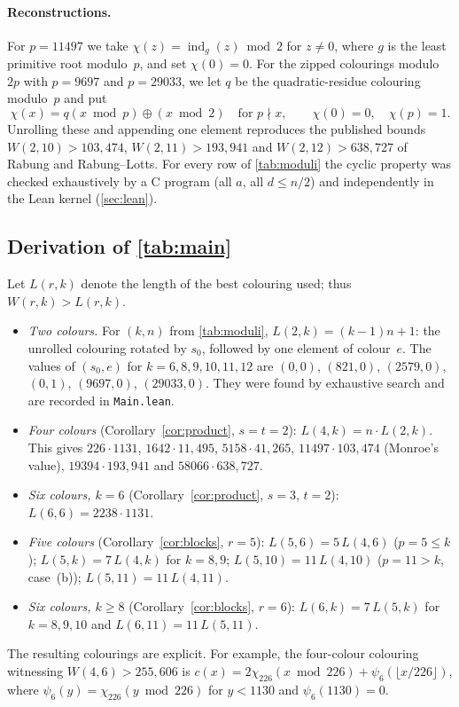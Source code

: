 \documentclass[11pt]{article}
\numberwithin{equation}{section}
\theoremstyle{definition}
\theoremstyle{remark}
\newcommand{\W}{W}
\begin{document}
\paragraph{Reconstructions.}
For $p=11497$ we take $\chi(z)=\operatorname{ind}_g(z)\bmod 2$ for $z\neq0$, where $g$ is the
least primitive root modulo~$p$, and set $\chi(0)=0$.  For the zipped colourings modulo $2p$
with $p=9697$ and $p=29033$, we let $q$ be the quadratic-residue colouring modulo~$p$ and put
\[ \chi(x)=q(x\bmod p)\oplus(x\bmod 2)\quad\text{for }p\nmid x,\qquad \chi(0)=0,\quad \chi(p)=1.\]
Unrolling these and appending one element reproduces the published bounds $\W(2,10)>103{,}474$,
$\W(2,11)>193{,}941$ and $\W(2,12)>638{,}727$ of Rabung and Rabung--Lotts.  For every row of
\cref{tab:moduli} the cyclic property was checked exhaustively by a C program (all $a$, all
$d\le n/2$) and independently in the Lean kernel (\cref{sec:lean}).

\subsection{Derivation of \texorpdfstring{\cref{tab:main}}{Table 1}}
Let $L(r,k)$ denote the length of the best colouring used; thus $\W(r,k)>L(r,k)$.
\begin{itemize}
\item \emph{Two colours.}  For $(k,n)$ from \cref{tab:moduli}, $L(2,k)=(k-1)n+1$: the unrolled
  colouring rotated by $s_0$, followed by one element of colour~$e$.  The values of $(s_0,e)$
  for $k=6,8,9,10,11,12$ are $(0,0)$, $(821,0)$, $(2579,0)$, $(0,1)$, $(9697,0)$, $(29033,0)$.
  They were found by exhaustive search and are recorded in \texttt{Main.lean}.
\item \emph{Four colours} (Corollary~\ref{cor:product}, $s=t=2$): $L(4,k)=n\cdot L(2,k)$.  This gives
  $226\cdot1131$, $1642\cdot11{,}495$, $5158\cdot41{,}265$, $11497\cdot103{,}474$ (Monroe's
  value), $19394\cdot193{,}941$ and $58066\cdot638{,}727$.
\item \emph{Six colours, $k=6$} (Corollary~\ref{cor:product}, $s=3$, $t=2$): $L(6,6)=2238\cdot1131$.
\item \emph{Five colours} (Corollary~\ref{cor:blocks}, $r=5$): $L(5,6)=5\,L(4,6)$ ($p=5\le k$);
  $L(5,k)=7\,L(4,k)$ for $k=8,9$; $L(5,10)=11\,L(4,10)$ ($p=11>k$, case~(b));
  $L(5,11)=11\,L(4,11)$.
\item \emph{Six colours, $k\ge8$} (Corollary~\ref{cor:blocks}, $r=6$): $L(6,k)=7\,L(5,k)$ for $k=8,9,10$
  and $L(6,11)=11\,L(5,11)$.
\end{itemize}
The resulting colourings are explicit.  For example, the four-colour colouring witnessing
$\W(4,6)>255{,}606$ is $c(x)=2\chi_{226}(x\bmod 226)+\psi_6(\lfloor x/226\rfloor)$, where
$\psi_6(y)=\chi_{226}(y\bmod226)$ for $y<1130$ and $\psi_6(1130)=0$.
\end{document}
